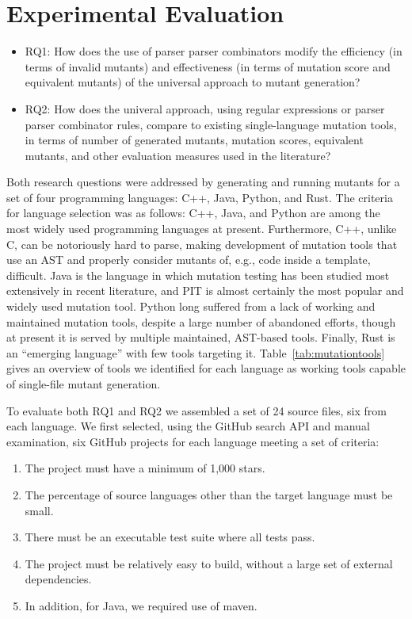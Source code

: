 \documentclass[sigconf,review, anonymous]{acmart}
\begin{document}
{\section{Experimental Evaluation}

\begin{itemize}

  \item{RQ1:}  How does the use of parser parser combinators modify 
    the efficiency (in terms of invalid mutants) and effectiveness (in
    terms of mutation score and equivalent mutants) of the universal
    approach to mutant generation?

\item{RQ2:}  How does the univeral approach, using regular expressions
  or parser parser combinator rules, compare to existing
  single-language mutation tools, in terms of number of generated
  mutants, mutation scores, equivalent mutants, and other evaluation measures used in the literature?

\end{itemize}


Both research questions were addressed by generating and running
mutants for a set of four programming languages: C++, Java, Python,
and Rust.  The criteria for language selection was as follows: C++,
Java, and Python are among the most widely used programming languages
at present.  Furthermore, C++, unlike C, can be notoriously hard to
parse, making development of mutation tools that use an AST and
properly consider mutants of, e.g., code inside a template,
difficult.  Java is the language in which mutation testing has been
studied most extensively in recent literature, and PIT is almost
certainly the most popular and widely used mutation tool.  Python long
suffered from a lack of working and maintained mutation tools, despite
a large number of abandoned efforts, though at present it is served by
multiple maintained, AST-based tools.  Finally, Rust is an ``emerging
language'' with few tools targeting it.  Table~\ref{tab:mutationtools}
gives an overview of tools we identified for each language as working tools
capable of single-file mutant generation.

To evaluate both RQ1 and RQ2 we assembled a set of 24 source files,
six from each language.  We first selected, using the GitHub search
API and manual examination, six GitHub
projects for each language meeting a set of criteria:

\begin{enumerate}
\item The project must have a minimum of 1,000 stars.
  \item The percentage of source languages other than the target
    language must be small.
  \item There must be an executable test suite where all tests pass.
    \item The project must be relatively easy to build, without a
      large set of external dependencies.
      \item In addition, for Java, we required use of maven.
      \end{enumerate}

}
\end{document}
